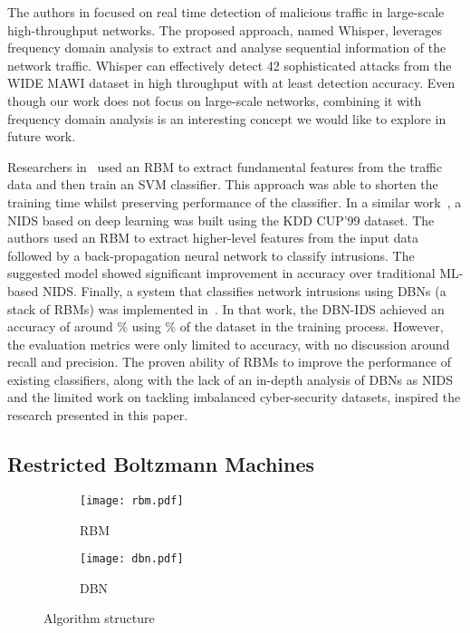 \documentclass[runningheads]{llncs}
\begin{document}
The authors in \cite{Whisper} focused on real time detection of malicious traffic in large-scale high-throughput networks. The proposed approach, named Whisper, leverages frequency domain analysis to extract and analyse sequential information of the network traffic. Whisper can effectively detect 42 sophisticated attacks from the WIDE MAWI dataset in high throughput with at least  detection accuracy. Even though our work does not focus on large-scale networks, combining it with frequency domain analysis is an interesting concept we would like to explore in future work. 

Researchers in~\cite{Yang} used an \ac{RBM} to extract fundamental features from the traffic data and then train an \ac{SVM} classifier. This approach was able to shorten the training time whilst preserving performance of the classifier. In a similar work~\cite{Peng}, a \ac{NIDS} based on deep learning was built using the KDD CUP'99 dataset. The authors used an \ac{RBM} to extract higher-level features from the input data followed by a back-propagation neural network to classify intrusions. The suggested model showed significant improvement in accuracy over traditional ML-based \ac{NIDS}. Finally, a system that classifies network intrusions using \acp{DBN} (a stack of \acp{RBM}) was implemented in~\cite{Alom}. In that work, the \ac{DBN}-\ac{IDS} achieved an accuracy of around \% using \% of the dataset in the training process. However, the evaluation metrics were only limited to accuracy, with no discussion around recall and precision. The proven ability of \acp{RBM} to improve the performance of existing classifiers, along with the lack of an in-depth analysis of \acp{DBN} as \ac{NIDS} and the limited work on tackling imbalanced cyber-security datasets, inspired the research presented in this paper.  


\subsection{Restricted Boltzmann Machines}
\label{subsec:rbm}

\begin{figure}[t]
\begin{subfigure}[b]{0.49\textwidth}
    \centering
    \texttt{[image: rbm.pdf]}
    \caption{\ac{RBM}}
    \label{subfig:rbm}
\end{subfigure}
\hfill
\begin{subfigure}[b]{0.49\textwidth}
    \centering
    \texttt{[image: dbn.pdf]}
    \caption{\ac{DBN}}
    \label{subfig:dbn}
\end{subfigure}
\caption{Algorithm structure}
\label{fig:algorithm structure}
\end{figure}
\end{document}
